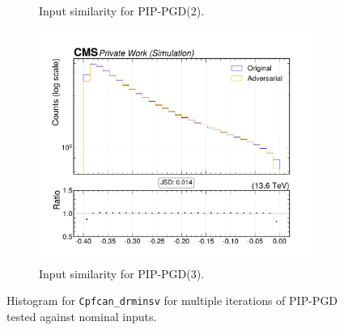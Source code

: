 \begin{figure}[htbp]
\begin{subfigure}[t]{0.32\textwidth}
    \caption*{Input similarity for PIP-PGD(2).}
  \end{subfigure}\hfill
  \begin{subfigure}[t]{0.32\textwidth}
    \includegraphics[width=\linewidth]{media/output/features/compare/combined_it_3/cmp_cpf_arr_Cpfcan_drminsv.pdf}
    \caption*{Input similarity for PIP-PGD(3).}
  \end{subfigure}

  \caption*{Histogram for \texttt{Cpfcan\_drminsv} for multiple iterations of PIP-PGD tested against nominal inputs.}
  \label{fig:combined_input_Cpfcan_drminsv}
\end{figure}

